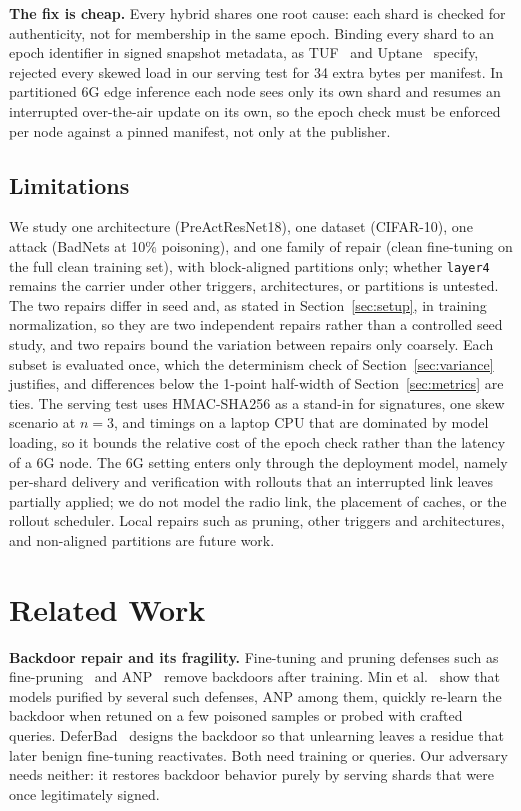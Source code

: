 \documentclass[conference,a4paper]{IEEEtran}  %
\begin{document}
\textbf{The fix is cheap.} Every hybrid shares one root cause: each shard is
checked for authenticity, not for membership in the same epoch. Binding every
shard to an epoch identifier in signed snapshot metadata, as TUF~\cite{tuf} and
Uptane~\cite{uptane} specify, rejected every skewed load in our serving test
for 34 extra bytes per manifest. In partitioned 6G edge inference each node
sees only its own shard and resumes an interrupted over-the-air update on its
own, so the epoch check must be enforced per node against a pinned manifest,
not only at the publisher.

\subsection{Limitations}

We study one architecture (PreActResNet18), one dataset (CIFAR-10), one attack
(BadNets at 10\% poisoning), and one family of repair (clean fine-tuning on
the full clean training set), with block-aligned partitions only; whether
\texttt{layer4} remains the carrier
under other triggers, architectures, or partitions is untested. The two
repairs differ in seed and, as stated in Section~\ref{sec:setup}, in training
normalization, so they are two independent repairs rather than a controlled
seed study, and two repairs bound the variation between repairs only coarsely.
Each subset is evaluated once, which the determinism check of
Section~\ref{sec:variance} justifies, and differences below the 1-point
half-width of Section~\ref{sec:metrics} are ties. The serving test uses
HMAC-SHA256 as a stand-in for signatures, one skew scenario at $n=3$, and
timings on a laptop CPU that are dominated by model loading, so it bounds the
relative cost of the epoch check rather than the latency of a 6G node. The 6G
setting enters only through the deployment model, namely per-shard delivery
and verification with rollouts that an interrupted link leaves partially
applied; we do not model the radio link, the placement of caches, or the
rollout scheduler. Local repairs such as pruning, other triggers and
architectures, and non-aligned partitions are future work.

\section{Related Work}
\label{sec:related}

\textbf{Backdoor repair and its fragility.} Fine-tuning and pruning
defenses such as fine-pruning~\cite{liu2018fineprune} and
ANP~\cite{wu2021anp} remove backdoors after training. Min et
al.~\cite{min2024uncovering} show that models purified by several such
defenses, ANP among them, quickly re-learn the
backdoor when retuned on a few poisoned samples or probed with crafted
queries. DeferBad~\cite{shin2024deferbad} designs the backdoor so that
unlearning leaves a residue that later benign fine-tuning reactivates.
Both need training or queries. Our adversary needs neither: it restores backdoor behavior purely by serving shards that were once legitimately signed.
\end{document}

